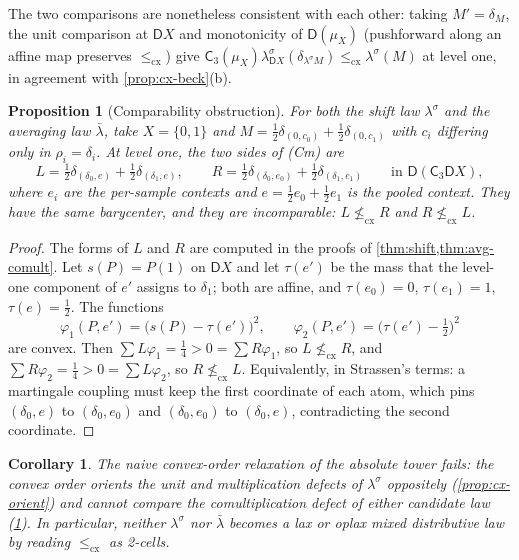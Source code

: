 \documentclass[11pt]{article}
\newtheorem{proposition}[theorem]{Proposition}
\newtheorem{corollary}[theorem]{Corollary}
\theoremstyle{definition}
\theoremstyle{remark}
\newcommand{\D}{\mathsf{D}}
\newcommand{\C}{\mathsf{C}}
\newcommand{\lb}{\bar\lambda}
\newcommand{\ls}{\lambda^{\sigma}}
\begin{document}
The two comparisons are nonetheless consistent with each other: taking $M'=\delta_M$, the unit
comparison at $\D X$ and monotonicity of $\D(\mu_X)$ (pushforward along an affine map preserves
$\le_{\mathrm{cx}}$) give $\C_3(\mu_X)\ls_{\D X}(\delta_{\ls M})\le_{\mathrm{cx}}\ls(M)$ at level one, in
agreement with \cref{prop:cx-beck}(b).

\begin{proposition}[Comparability obstruction]\label{prop:cx-comult}
For both the shift law $\ls$ and the averaging law $\lb$, take $X=\{0,1\}$ and
$M=\tfrac12\delta_{(0,c_0)}+\tfrac12\delta_{(0,c_1)}$ with $c_i$ differing only in $\rho_i=\delta_i$.
At level one, the two sides of (Cm) are
\[
L=\tfrac12\delta_{(\delta_0,e)}+\tfrac12\delta_{(\delta_1,e)},\qquad
R=\tfrac12\delta_{(\delta_0,e_0)}+\tfrac12\delta_{(\delta_1,e_1)}\qquad\text{in }\D(\C_3\D X),
\]
where $e_i$ are the per-sample contexts and $e=\tfrac12e_0+\tfrac12e_1$ is the pooled context. They have
the same barycenter, and they are incomparable: $L\not\le_{\mathrm{cx}}R$ and $R\not\le_{\mathrm{cx}}L$.
\end{proposition}
\begin{proof}
The forms of $L$ and $R$ are computed in the proofs of \cref{thm:shift,thm:avg-comult}. Let
$s(P)=P(1)$ on $\D X$ and let $\tau(e')$ be the mass that the level-one component of $e'$ assigns to
$\delta_1$; both are affine, and $\tau(e_0)=0$, $\tau(e_1)=1$, $\tau(e)=\tfrac12$. The functions
\[
\varphi_1(P,e')=\big(s(P)-\tau(e')\big)^2,\qquad \varphi_2(P,e')=\big(\tau(e')-\tfrac12\big)^2
\]
are convex. Then $\sum L\varphi_1=\tfrac14>0=\sum R\varphi_1$, so $L\not\le_{\mathrm{cx}}R$, and
$\sum R\varphi_2=\tfrac14>0=\sum L\varphi_2$, so $R\not\le_{\mathrm{cx}}L$. Equivalently, in Strassen's
terms: a martingale coupling must keep the first coordinate of each atom, which pins $(\delta_0,e)$ to
$(\delta_0,e_0)$ and $(\delta_0,e_0)$ to $(\delta_0,e)$, contradicting the second coordinate.
\end{proof}

\begin{corollary}\label{cor:cx-fails}
The naive convex-order relaxation of the absolute tower fails: the convex order orients the unit and
multiplication defects of $\ls$ oppositely (\cref{prop:cx-orient}) and cannot compare the
comultiplication defect of either candidate law (\cref{prop:cx-comult}). In particular, neither $\ls$
nor $\lb$ becomes a lax or oplax mixed distributive law by reading $\le_{\mathrm{cx}}$ as 2-cells.
\end{corollary}
\end{document}
